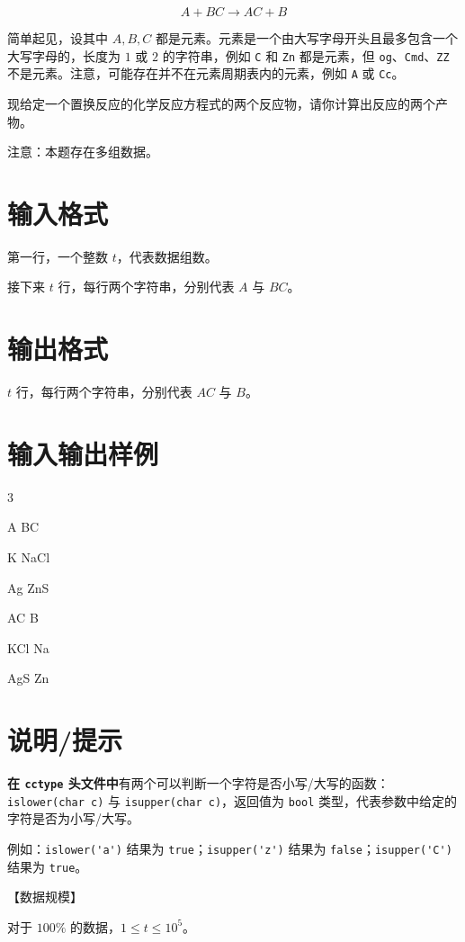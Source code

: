 \documentclass{../cpct/ctpro}
\begin{document}
$$A+BC \longrightarrow AC+B$$

简单起见，设其中 $A,B,C$ 都是元素。元素是一个由大写字母开头且最多包含一个大写字母的，长度为 $1$ 或 $2$ 的字符串，例如 \texttt{C} 和 \texttt{Zn} 都是元素，但 \texttt{og}、\texttt{Cmd}、\texttt{ZZ} 不是元素。注意，可能存在并不在元素周期表内的元素，例如 \texttt{A} 或 \texttt{Cc}。

现给定一个置换反应的化学反应方程式的两个反应物，请你计算出反应的两个产物。

注意：本题存在多组数据。

\section*{输入格式}

第一行，一个整数 $t$，代表数据组数。

接下来 $t$ 行，每行两个字符串，分别代表 $A$ 与 $BC$。

\section*{输出格式}

$t$ 行，每行两个字符串，分别代表 $AC$ 与 $B$。

\section*{输入输出样例}
\testcasetab
{
    3 \par
    A BC \par
    K NaCl \par
    Ag ZnS
}
{
    AC B \par
    KCl Na \par
    AgS Zn
}

\section*{说明/提示}

\textbf{在 \lstinline{cctype} 头文件中}有两个可以判断一个字符是否小写/大写的函数：\lstinline{islower(char c)} 与 \lstinline{isupper(char c)}，返回值为 \lstinline{bool} 类型，代表参数中给定的字符是否为小写/大写。

例如：\lstinline{islower('a')} 结果为 \lstinline{true}；\lstinline{isupper('z')} 结果为 \lstinline{false}；\lstinline{isupper('C')} 结果为 \lstinline{true}。

【数据规模】

对于 $100 \%$ 的数据，$1 \leq t \leq {10}^5$。
\end{document}
